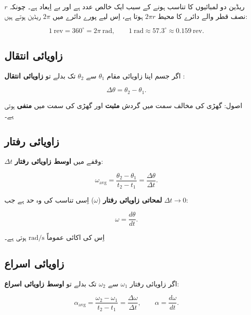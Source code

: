 \documentclass{urdu-textbook}
\begin{document}
ریڈین دو لمبائیوں کا تناسب ہونے کے سبب ایک خالص عدد ہے اور بے اِبعاد ہے۔
چونکہ \(r\) نصف قطر والے دائرے کا محیط \(2\pi r\) ہوتا ہے، اِس لیے پورے
دائرے میں \(2\pi\) ریڈین ہوتے ہیں:

\[1\ \mathrm{rev} = 360^{\circ} = 2\pi\ \mathrm{rad}, \qquad 1\ \mathrm{rad} \approx 57.3^{\circ} \approx 0.159\ \mathrm{rev}.\]

\hypertarget{ux632ux627ux648ux6ccux627ux626ux6cc-ux627ux646ux62aux642ux627ux644}{%
\subsection{زاویائی
انتقال}\label{ux632ux627ux648ux6ccux627ux626ux6cc-ux627ux646ux62aux642ux627ux644}}

اگر جسم اپنا زاویائی مقام \(\theta_1\) سے \(\theta_2\) تک بدلے تو
\textbf{زاویائی انتقال} :

\[\Delta\theta = \theta_2 - \theta_1.\]

اصول: گھڑی کی مخالف سمت میں گردش \textbf{مثبت} اور گھڑی کی سمت میں
\textbf{منفی} ہوتی ہے۔

\hypertarget{ux632ux627ux648ux6ccux627ux626ux6cc-ux631ux641ux62aux627ux631}{%
\subsection{زاویائی
رفتار}\label{ux632ux627ux648ux6ccux627ux626ux6cc-ux631ux641ux62aux627ux631}}

\(\Delta t\) وقفے میں \textbf{اوسط زاویائی رفتار}:

\[\omega_{\mathrm{avg}} = \frac{\theta_2-\theta_1}{t_2-t_1} = \frac{\Delta\theta}{\Delta t}.\]

\textbf{لمحاتی زاویائی رفتار} (\(\omega\)) اِسی تناسب کی وہ حد ہے جب
\(\Delta t \to 0\):

\[\omega = \frac{d\theta}{dt}.\]

اِس کی اکائی عموماً \(\mathrm{rad/s}\) ہوتی ہے۔

\hypertarget{ux632ux627ux648ux6ccux627ux626ux6cc-ux627ux633ux631ux627ux639}{%
\subsection{زاویائی
اسراع}\label{ux632ux627ux648ux6ccux627ux626ux6cc-ux627ux633ux631ux627ux639}}

اگر زاویائی رفتار \(\omega_1\) سے \(\omega_2\) تک بدلے تو \textbf{اوسط
زاویائی اسراع}:

\[\alpha_{\mathrm{avg}} = \frac{\omega_2-\omega_1}{t_2-t_1} = \frac{\Delta\omega}{\Delta t}, \qquad \alpha = \frac{d\omega}{dt}.\]
\end{document}
